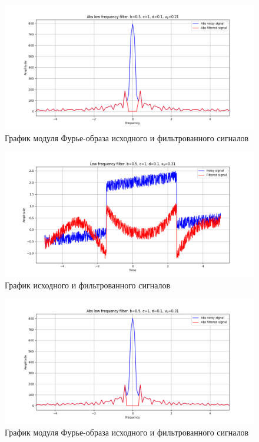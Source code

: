 \documentclass[a4paper, 12pt]{article}
\begin{document}
    \begin{figure}[!htb]
        \centering
        \includegraphics[scale=0.485]{2_abs_u_U_nolow.png}
        \captionsetup{skip=0pt}
        \caption{График модуля Фурье-образа исходного и фильтрованного сигналов}
        \label{fig:fig30}
    \end{figure}
    \begin{figure}[!htb]
        \centering
        \includegraphics[scale=0.485]{3_u_flt_u_nolow.png}
        \captionsetup{skip=0pt}
        \caption{График исходного и фильтрованного сигналов}
        \label{fig:fig31}
    \end{figure}
    \begin{figure}[!htb]
        \centering
        \includegraphics[scale=0.485]{3_abs_u_U_nolow.png}
        \captionsetup{skip=0pt}
        \caption{График модуля Фурье-образа исходного и фильтрованного сигналов}
        \label{fig:fig32}
    \end{figure}
\end{document}
